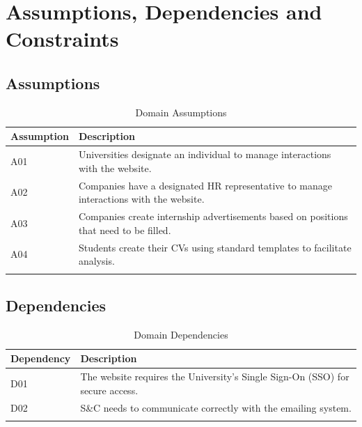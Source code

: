 \section{Assumptions, Dependencies and Constraints}
\label{sec:assumptions_dependencies_and_constraints}%

\subsection{Assumptions}
\label{sub:assumptions}%

\begin{longtable}{|l|p{}|}
      \hline
      \textbf{Assumption} & \textbf{Description}                                                                   \\
      \hline
      A01                 & Universities designate an individual to manage interactions with the website.          \\
      \hline
      A02                 & Companies have a designated HR representative to manage interactions with the website. \\
      \hline
      A03                 & Companies create internship advertisements based on positions that need to be filled.  \\
      \hline
      A04                 & Students create their CVs using standard templates to facilitate analysis.             \\
      \hline

      \caption{Domain Assumptions}
      \label{tab:domain_assumptions}
\end{longtable}

\subsection{Dependencies}
\label{sub:dependencies}%

\begin{longtable}{|l|p{}|}
      \hline
      \textbf{Dependency} & \textbf{Description}                                                          \\
      \hline
      D01                 & The website requires the University's Single Sign-On (SSO) for secure access. \\
      \hline
      D02                 & S\&C needs to communicate correctly with the emailing system.                 \\
      \hline

      \caption{Domain Dependencies}
      \label{tab:domain_dependencies}
\end{longtable}

